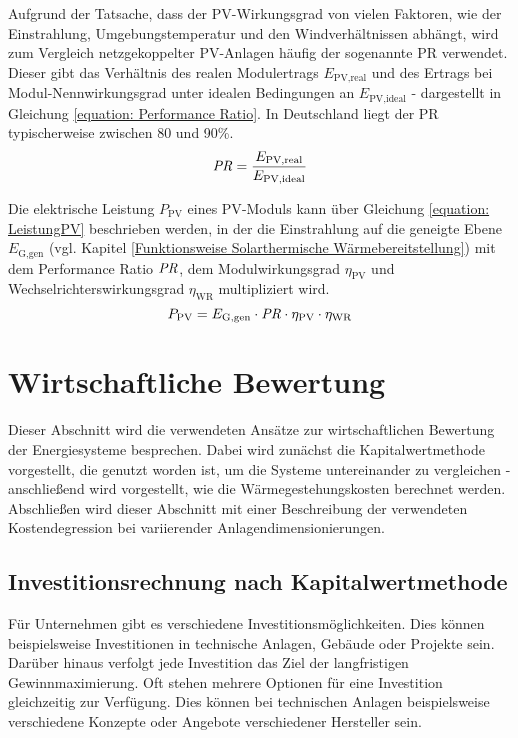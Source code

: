 Aufgrund der Tatsache, dass der \ac{PV}-Wirkungsgrad von  vielen Faktoren, wie der Einstrahlung, Umgebungstemperatur und den Windverhältnissen abhängt, wird zum Vergleich netzgekoppelter \ac{PV}-Anlagen häufig der sogenannte \ac{PR} verwendet. Dieser gibt das Verhältnis des realen Modulertrags $E_\text{PV,real}$ und des Ertrags bei Modul-Nennwirkungsgrad unter idealen Bedingungen an $E_\text{PV,ideal}$ - dargestellt in Gleichung \ref{equation: Performance Ratio}. In Deutschland liegt der \ac{PR} typischerweise zwischen 80 und 90\%. \cite{ISE}
	\begin{equation}\label{equation: Performance Ratio}
		\text{\textit{PR}} = \dfrac{E_\text{PV,real}}{E_\text{PV,ideal}}
	\end{equation}

Die elektrische Leistung $P_\text{PV}$ eines \ac{PV}-Moduls kann über Gleichung \ref{equation: LeistungPV} beschrieben werden, in der die Einstrahlung auf die geneigte Ebene $E_\text{G,gen}$ (vgl. Kapitel \ref{Funktionsweise Solarthermische Wärmebereitstellung}) mit dem Performance Ratio $\text{\textit{PR}}$, dem Modulwirkungsgrad $\eta_\text{PV}$ und Wechselrichterswirkungsgrad $\eta_\text{WR}$ multipliziert wird.
	\begin{equation}\label{equation: LeistungPV}
		P_\text{PV} = E_\text{G,gen} \cdot \text{\textit{PR}} \cdot \eta_\text{PV} \cdot \eta_\text{WR}
	\end{equation}


\section{Wirtschaftliche Bewertung}\label{section: Wirtschaftliche Bewertung}
Dieser Abschnitt wird die verwendeten Ansätze zur wirtschaftlichen Bewertung der Energiesysteme besprechen. Dabei wird zunächst die Kapitalwertmethode vorgestellt, die genutzt worden ist, um die Systeme untereinander zu vergleichen - anschließend wird vorgestellt, wie die Wärmegestehungskosten berechnet werden. Abschließen wird dieser Abschnitt mit einer Beschreibung der verwendeten Kostendegression bei variierender Anlagendimensionierungen.

\subsection{Investitionsrechnung nach Kapitalwertmethode}\label{subsection: Methoden der Investitionsrechnung}
Für Unternehmen gibt es verschiedene Investitionsmöglichkeiten. Dies können beispielsweise Investitionen in technische Anlagen, Gebäude oder Projekte sein. Darüber hinaus verfolgt jede Investition das Ziel der langfristigen Gewinnmaximierung. Oft stehen mehrere Optionen für eine Investition gleichzeitig zur Verfügung. Dies können bei technischen Anlagen beispielsweise verschiedene Konzepte oder Angebote verschiedener Hersteller sein. 

